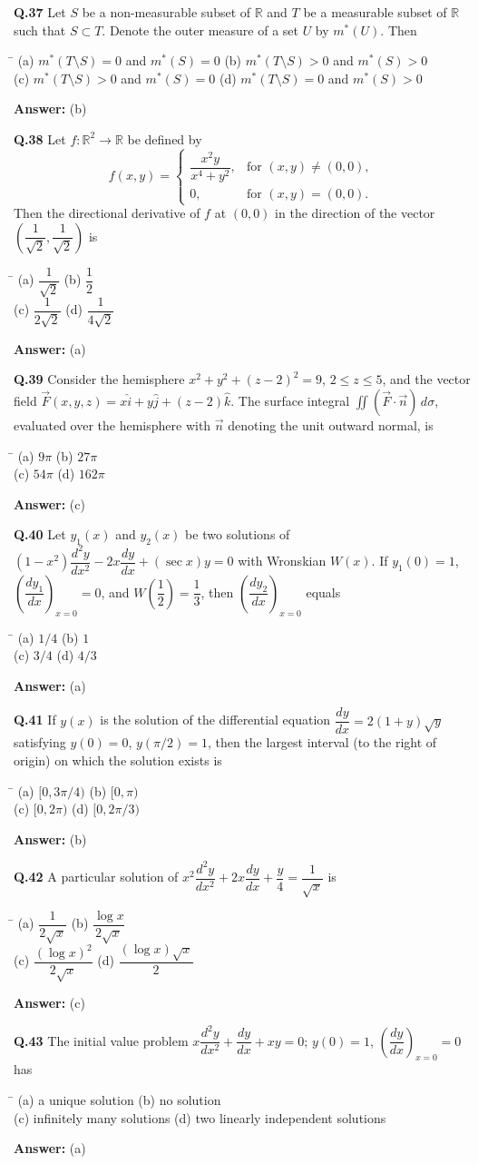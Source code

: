\documentclass[11pt,a4paper]{article}
\newcommand{\optsfour}[4]{%
  \begin{tabbing}
    \hspace{0.48\linewidth}\=\kill
    (a) #1 \> (b) #2 \\[2pt]
    (c) #3 \> (d) #4
  \end{tabbing}%
}
\newcommand{\ans}[1]{\textbf{Answer:} #1\par\medskip}
\begin{document}
\textbf{Q.37} Let $S$ be a non-measurable subset of $\mathbb{R}$ and $T$ be a measurable subset of $\mathbb{R}$ such that $S \subset T$. Denote the outer measure of a set $U$ by $m^*(U)$. Then
\optsfour{$m^*(T \setminus S) = 0$ and $m^*(S) = 0$}{$m^*(T \setminus S) > 0$ and $m^*(S) > 0$}{$m^*(T \setminus S) > 0$ and $m^*(S) = 0$}{$m^*(T \setminus S) = 0$ and $m^*(S) > 0$}
\ans{(b)}

\textbf{Q.38} Let $f : \mathbb{R}^2 \to \mathbb{R}$ be defined by
\[
  f(x, y) = \begin{cases} \dfrac{x^2 y}{x^4 + y^2}, & \text{for } (x, y) \ne (0, 0), \\ 0, & \text{for } (x, y) = (0, 0). \end{cases}
\]
Then the directional derivative of $f$ at $(0, 0)$ in the direction of the vector $\left(\dfrac{1}{\sqrt{2}}, \dfrac{1}{\sqrt{2}}\right)$ is
\optsfour{$\dfrac{1}{\sqrt{2}}$}{$\dfrac{1}{2}$}{$\dfrac{1}{2\sqrt{2}}$}{$\dfrac{1}{4\sqrt{2}}$}
\ans{(a)}

\textbf{Q.39} Consider the hemisphere $x^2 + y^2 + (z - 2)^2 = 9$, $2 \le z \le 5$, and the vector field $\vec{F}(x,y,z) = x\hat{i} + y\hat{j} + (z - 2)\hat{k}$. The surface integral $\displaystyle\iint (\vec{F} \cdot \vec{n})\,d\sigma$, evaluated over the hemisphere with $\vec{n}$ denoting the unit outward normal, is
\optsfour{$9\pi$}{$27\pi$}{$54\pi$}{$162\pi$}
\ans{(c)}

\textbf{Q.40} Let $y_1(x)$ and $y_2(x)$ be two solutions of $(1 - x^2)\dfrac{d^2 y}{dx^2} - 2x\dfrac{dy}{dx} + (\sec x)y = 0$ with Wronskian $W(x)$. If $y_1(0) = 1$, $\left(\dfrac{dy_1}{dx}\right)_{x=0} = 0$, and $W\!\left(\dfrac{1}{2}\right) = \dfrac{1}{3}$, then $\left(\dfrac{dy_2}{dx}\right)_{x=0}$ equals
\optsfour{$1/4$}{$1$}{$3/4$}{$4/3$}
\ans{(a)}

\textbf{Q.41} If $y(x)$ is the solution of the differential equation $\dfrac{dy}{dx} = 2(1 + y)\sqrt{y}$ satisfying $y(0) = 0$, $y(\pi/2) = 1$, then the largest interval (to the right of origin) on which the solution exists is
\optsfour{$[0, 3\pi/4)$}{$[0, \pi)$}{$[0, 2\pi)$}{$[0, 2\pi/3)$}
\ans{(b)}

\textbf{Q.42} A particular solution of $x^2\dfrac{d^2 y}{dx^2} + 2x\dfrac{dy}{dx} + \dfrac{y}{4} = \dfrac{1}{\sqrt{x}}$ is
\optsfour{$\dfrac{1}{2\sqrt{x}}$}{$\dfrac{\log x}{2\sqrt{x}}$}{$\dfrac{(\log x)^2}{2\sqrt{x}}$}{$\dfrac{(\log x)\sqrt{x}}{2}$}
\ans{(c)}

\textbf{Q.43} The initial value problem $x\dfrac{d^2 y}{dx^2} + \dfrac{dy}{dx} + xy = 0$; $y(0) = 1$, $\left(\dfrac{dy}{dx}\right)_{x=0} = 0$ has
\optsfour{a unique solution}{no solution}{infinitely many solutions}{two linearly independent solutions}
\ans{(a)}
\end{document}
